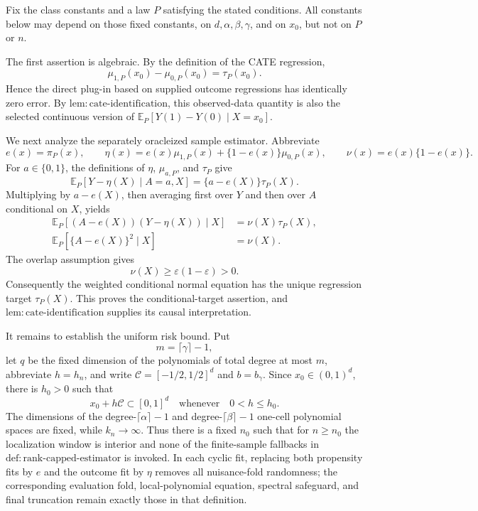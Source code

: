 Fix the class constants and a law \(P\) satisfying the stated conditions.  All constants below may depend on those fixed constants, on \(d,\alpha,\beta,\gamma\), and on \(x_0\), but not on \(P\) or \(n\).

The first assertion is algebraic.  By the definition of the CATE regression,
\[
\mu_{1,P}(x_0)-\mu_{0,P}(x_0)=\tau_P(x_0).
\]
Hence the direct plug-in based on supplied outcome regressions has identically zero error.  By \(\mathrm{lem:cate\mbox{-}identification}\), this observed-data quantity is also the selected continuous version of \(\mathbb E_P[Y(1)-Y(0)\mid X=x_0]\).

We next analyze the separately oracleized sample estimator.  Abbreviate
\[
e(x)=\pi_P(x),\qquad
\eta(x)=e(x)\mu_{1,P}(x)+\{1-e(x)\}\mu_{0,P}(x),
\qquad
\nu(x)=e(x)\{1-e(x)\}.
\]
For \(a\in\{0,1\}\), the definitions of \(\eta\), \(\mu_{a,P}\), and \(\tau_P\) give
\[
\mathbb E_P[Y-\eta(X)\mid A=a,X]
=\{a-e(X)\}\tau_P(X).
\]
Multiplying by \(a-e(X)\), then averaging first over \(Y\) and then over \(A\) conditional on \(X\), yields
\[
\begin{aligned}
\mathbb E_P[(A-e(X))(Y-\eta(X))\mid X]
&=\nu(X)\tau_P(X),\\
\mathbb E_P[\{A-e(X)\}^2\mid X]
&=\nu(X).
\end{aligned}
\]
The overlap assumption gives
\[
\nu(X)\geq\varepsilon(1-\varepsilon)>0.
\]
Consequently the weighted conditional normal equation has the unique regression target \(\tau_P(X)\).  This proves the conditional-target assertion, and \(\mathrm{lem:cate\mbox{-}identification}\) supplies its causal interpretation.

It remains to establish the uniform risk bound.  Put
\[
m=\lceil\gamma\rceil-1,
\]
let \(q\) be the fixed dimension of the polynomials of total degree at most \(m\), abbreviate \(h=h_n\), and write \(\mathcal C=[-1/2,1/2]^d\) and \(b=b_\gamma\).  Since \(x_0\in(0,1)^d\), there is \(h_0>0\) such that
\[
x_0+h\mathcal C\subset[0,1]^d
\quad\text{whenever}\quad 0<h\leq h_0.
\]
The dimensions of the degree-\(\lceil\alpha\rceil-1\) and degree-\(\lceil\beta\rceil-1\) one-cell polynomial spaces are fixed, while \(k_n\to\infty\).  Thus there is a fixed \(n_0\) such that for \(n\geq n_0\) the localization window is interior and none of the finite-sample fallbacks in \(\mathrm{def:rank\mbox{-}capped\mbox{-}estimator}\) is invoked.  In each cyclic fit, replacing both propensity fits by \(e\) and the outcome fit by \(\eta\) removes all nuisance-fold randomness; the corresponding evaluation fold, local-polynomial equation, spectral safeguard, and final truncation remain exactly those in that definition.

